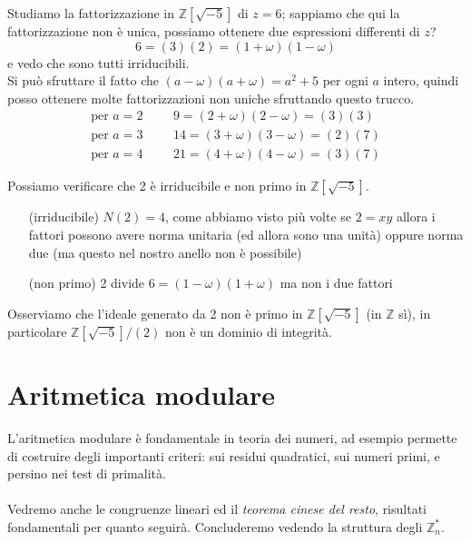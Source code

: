 \begin{esercizio}
	Studiamo la fattorizzazione in $\mathbb{Z}[\sqrt{-5}]$ di $z=6$; sappiamo che qui la fattorizzazione non è unica, possiamo ottenere due espressioni differenti di $z$?
	\begin{equation*}
	6 =(3)(2) =(1+\omega)(1-\omega)
	\end{equation*}
	e vedo che sono tutti irriducibili. \\ Si può sfruttare il fatto che $(a-\omega)(a+\omega)=a^2+5$ per ogni $a$ intero, quindi posso ottenere molte fattorizzazioni non uniche sfruttando questo trucco.
	\begin{equation*}
		\begin{array}{lllr}
			\text{per $a=2$} & & &
				9=(2+\omega)(2-\omega)=(3)(3)\\
			\text{per $a=3$} & & &
				14=(3+\omega)(3-\omega)=(2)(7)\\
			\text{per $a=4$} & & &
				21=(4+\omega)(4-\omega)=(3)(7)		
		\end{array}
	\end{equation*}
\end{esercizio}
\begin{esercizio}
	Possiamo verificare che 2 è irriducibile e non primo in $\mathbb{Z}[\sqrt{-5}]$. 
	\begin{itemize}
		\item[(irriducibile)] $N(2)=4$, come abbiamo visto più volte se $2=xy$ allora i fattori possono avere norma unitaria (ed allora sono una unità) oppure norma due (ma questo nel nostro anello non è possibile)
		\item[(non primo)] 2 divide $6=(1-\omega)(1+\omega)$ ma non i due fattori
	\end{itemize}
Osserviamo che l'ideale generato da 2 non è primo in $\mathbb{Z}[\sqrt{-5}]$ (in $\mathbb{Z}$ sì), in particolare $\mathbb{Z}[\sqrt{-5}]/(2)$ non è un dominio di integrità.
\end{esercizio}




\chapter{Aritmetica modulare}
L'aritmetica modulare è fondamentale in teoria dei numeri, ad esempio permette di costruire degli importanti criteri: sui residui quadratici, sui numeri primi, e persino nei test di primalità. \\ \\ Vedremo anche le congruenze lineari ed il \textit{teorema cinese del resto}, risultati fondamentali per quanto seguirà. Concluderemo vedendo la struttura degli $\mathbb{Z}_n^*$.



